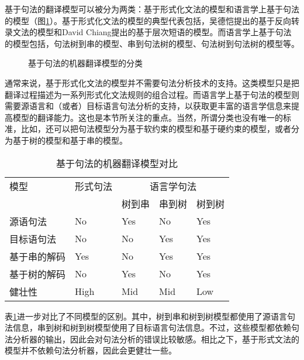 \parinterval 基于句法的翻译模型可以被分为两类：基于形式化文法的模型和语言学上基于句法的模型（图\ref{fig:4-44}）。基于形式化文法的模型的典型代表包括，吴德恺提出的基于反向转录文法的模型\cite{wu1997stochastic}和David Chiang提出的基于层次短语的模型\cite{chiang2007hierarchical}。而语言学上基于句法的模型包括，句法树到串的模型\cite{liu2006tree,huang2006statistical}、串到句法树的模型\cite{galley2006scalable,galley2004s}、句法树到句法树的模型\cite{eisner2003learning,zhang2008tree,liu2009improving,chiang2010learning}等。

\begin{figure}[htp]
\centering

\caption{基于句法的机器翻译模型的分类}
\label{fig:4-44}
\end{figure}

\parinterval 通常来说，基于形式化文法的模型并不需要句法分析技术的支持。这类模型只是把翻译过程描述为一系列形式化文法规则的组合过程。而语言学上基于句法的模型则需要源语言和（或者）目标语言句法分析的支持，以获取更丰富的语言学信息来提高模型的翻译能力。这也是本节所关注的重点。当然，所谓分类也没有唯一的标准，比如，还可以把句法模型分为基于软约束的模型和基于硬约束的模型，或者分为基于树的模型和基于串的模型。

\begin{table}[htp]{
\begin{center}
\caption{基于句法的机器翻译模型对比}
\label{tab:4-3}
{
\begin{tabular}{l | l | l | l | l}
模型 & 形式句法 & \multicolumn{3}{c}{语言学句法} \\
\cline{3-5}
\rule{0pt}{15pt} & & \multicolumn{1}{c|}{树到串} & \multicolumn{1}{c}{串到树} & \multicolumn{1}{|c}{树到树} \\
\hline
源语句法 & No & Yes & No & Yes \\
目标语句法 & No & No & Yes & Yes \\
基于串的解码 & Yes & No & Yes & Yes \\
基于树的解码 & No & Yes & No & Yes \\
健壮性 & High & Mid & Mid & Low \\
\end{tabular}
}
\end{center}
}\end{table}

\parinterval 表\ref{tab:4-3}进一步对比了不同模型的区别。其中，树到串和树到树模型都使用了源语言句法信息，串到树和树到树模型使用了目标语言句法信息。不过，这些模型都依赖句法分析器的输出，因此会对句法分析的错误比较敏感。相比之下，基于形式文法的模型并不依赖句法分析器，因此会更健壮一些。

